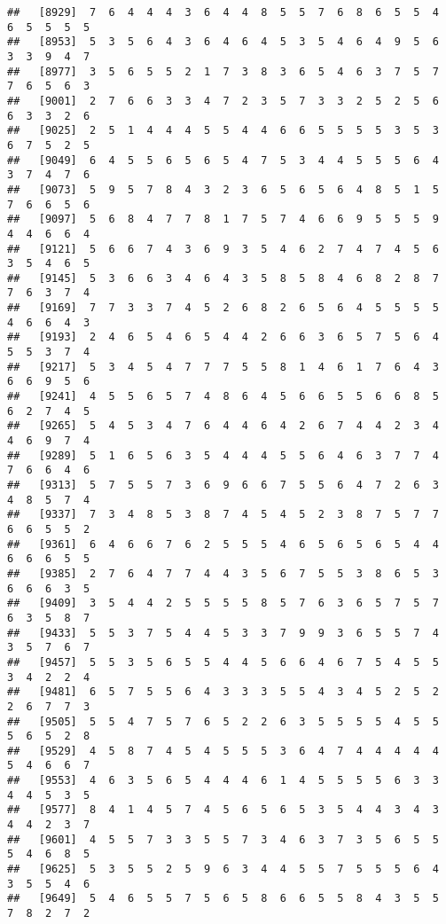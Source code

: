 \documentclass[
]{book}
\begin{document}
\begin{verbatim}
##   [8929]  7  6  4  4  4  3  6  4  4  8  5  5  7  6  8  6  5  5  4  6  5  5  5  5
##   [8953]  5  3  5  6  4  3  6  4  6  4  5  3  5  4  6  4  9  5  6  3  3  9  4  7
##   [8977]  3  5  6  5  5  2  1  7  3  8  3  6  5  4  6  3  7  5  7  7  6  5  6  3
##   [9001]  2  7  6  6  3  3  4  7  2  3  5  7  3  3  2  5  2  5  6  6  3  3  2  6
##   [9025]  2  5  1  4  4  4  5  5  4  4  6  6  5  5  5  5  3  5  3  6  7  5  2  5
##   [9049]  6  4  5  5  6  5  6  5  4  7  5  3  4  4  5  5  5  6  4  3  7  4  7  6
##   [9073]  5  9  5  7  8  4  3  2  3  6  5  6  5  6  4  8  5  1  5  7  6  6  5  6
##   [9097]  5  6  8  4  7  7  8  1  7  5  7  4  6  6  9  5  5  5  9  4  4  6  6  4
##   [9121]  5  6  6  7  4  3  6  9  3  5  4  6  2  7  4  7  4  5  6  3  5  4  6  5
##   [9145]  5  3  6  6  3  4  6  4  3  5  8  5  8  4  6  8  2  8  7  7  6  3  7  4
##   [9169]  7  7  3  3  7  4  5  2  6  8  2  6  5  6  4  5  5  5  5  4  6  6  4  3
##   [9193]  2  4  6  5  4  6  5  4  4  2  6  6  3  6  5  7  5  6  4  5  5  3  7  4
##   [9217]  5  3  4  5  4  7  7  7  5  5  8  1  4  6  1  7  6  4  3  6  6  9  5  6
##   [9241]  4  5  5  6  5  7  4  8  6  4  5  6  6  5  5  6  6  8  5  6  2  7  4  5
##   [9265]  5  4  5  3  4  7  6  4  4  6  4  2  6  7  4  4  2  3  4  4  6  9  7  4
##   [9289]  5  1  6  5  6  3  5  4  4  4  5  5  6  4  6  3  7  7  4  7  6  6  4  6
##   [9313]  5  7  5  5  7  3  6  9  6  6  7  5  5  6  4  7  2  6  3  4  8  5  7  4
##   [9337]  7  3  4  8  5  3  8  7  4  5  4  5  2  3  8  7  5  7  7  6  6  5  5  2
##   [9361]  6  4  6  6  7  6  2  5  5  5  4  6  5  6  5  6  5  4  4  6  6  6  5  5
##   [9385]  2  7  6  4  7  7  4  4  3  5  6  7  5  5  3  8  6  5  3  6  6  6  3  5
##   [9409]  3  5  4  4  2  5  5  5  5  8  5  7  6  3  6  5  7  5  7  6  3  5  8  7
##   [9433]  5  5  3  7  5  4  4  5  3  3  7  9  9  3  6  5  5  7  4  3  5  7  6  7
##   [9457]  5  5  3  5  6  5  5  4  4  5  6  6  4  6  7  5  4  5  5  3  4  2  2  4
##   [9481]  6  5  7  5  5  6  4  3  3  3  5  5  4  3  4  5  2  5  2  2  6  7  7  3
##   [9505]  5  5  4  7  5  7  6  5  2  2  6  3  5  5  5  5  4  5  5  5  6  5  2  8
##   [9529]  4  5  8  7  4  5  4  5  5  5  3  6  4  7  4  4  4  4  4  5  4  6  6  7
##   [9553]  4  6  3  5  6  5  4  4  4  6  1  4  5  5  5  5  6  3  3  4  4  5  3  5
##   [9577]  8  4  1  4  5  7  4  5  6  5  6  5  3  5  4  4  3  4  3  4  4  2  3  7
##   [9601]  4  5  5  7  3  3  5  5  7  3  4  6  3  7  3  5  6  5  5  5  4  6  8  5
##   [9625]  5  3  5  5  2  5  9  6  3  4  4  5  5  7  5  5  5  6  4  3  5  5  4  6
##   [9649]  5  4  6  5  5  7  5  6  5  8  6  6  5  5  8  4  3  5  5  7  8  2  7  2

\end{verbatim}
\end{document}

